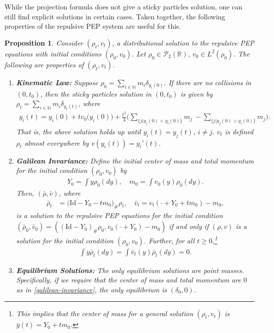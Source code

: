 \documentclass[11pt]{article}
\newtheorem{proposition}[theorem]{Proposition}
\numberwithin{equation}{section}
\begin{document}
        While the projection formula does not give a sticky particles solution, one can still find explicit solutions in certain cases. Taken together, the following properties of the repulsive PEP system are useful for this.
        \begin{proposition}\label{properties}
            Consider $(\rho_t,v_t)$, a distributional solution to the repulsive PEP equations with initial conditions $(\rho_0,v_0)$. Let $\rho_0\in\mathcal{P}_2(\mathbb{R})$, $v_0\in L^2(\rho_0)$. The following are properties of $(\rho_t,v_t)$. 
            \begin{enumerate}
                \item \textbf{Kinematic Law:}\label{particle-kinematics} Suppose $\rho_0=\sum_{i\in\mathbb{N}}m_i\delta_{y_i(0)}$. If there are no collisions in $(0,t_0)$, then the sticky particles solution in $(0,t_0)$ is given by $\rho_t=\sum_{i\in\mathbb{N}}m_i\delta_{y_i(t)}$, where
                \begin{align} \label{kinematics}
                    y_i(t)=y_i(0)+tv_0\big(y_i(0)\big)+\frac{t^2}{4}\Big(\sum_{\{j | y_j(0)<y_i(0)\}}m_j\ -\sum_{\{j | y_j(0)>y_i(0)\}}m_j\Big). 
                \end{align}       
                That is, the above solution holds up until $y_i(t)=y_j(t)$, $i\neq j$. $v_t$ is defined $\rho_t$ almost everywhere by $v(y_i(t))=y_i'(t)$.
                \item \textbf{Galilean Invariance:}\label{galilean-invariance} Define the initial center of mass and total momentum for the initial condition $(\rho_0,v_0)$ by 
                    \begin{align}
                        Y_0=\int y\rho_0(dy), \quad m_0=\int v_0(y)\rho_0(dy).
                    \end{align}
                    Then, $(\bar{\rho},\bar{v})$, where 
                    \begin{align*}
                        \bar{\rho}_t&=\big(\text{Id}-Y_0-tm_0\big)_\#\rho_t, \quad \bar{v}_t=v_t(\cdot+Y_0+tm_0)-m_0,
                    \end{align*}
                    is a solution to the repulsive PEP equations for the initial condition $(\bar{\rho}_0,\bar{v}_0)=((\text{Id}-Y_0)_\#\rho_0,v_0(\cdot+Y_0)-m_0)$ if and only if $(\rho,v)$ is a solution for the initial condition $(\rho_0,v_0)$. Further, for all $t\geq0$,\footnote{This implies that the center of mass for a general solution $(\rho_t,v_t)$ is $\bar{y}(t)=Y_0+tm_0$.}
                    \begin{align*}
                        \int y \bar{\rho}_t(dy)=\int \bar{v}_t(y) \bar{\rho}_t(dy)=0.
                    \end{align*}
                \item \textbf{Equilibrium Solutions:}\label{only-equilibrium} The only equilibrium solutions are point masses. Specifically, if we require that the center of mass and total momentum are $0$ as in \ref{galilean-invariance}, the only equilibrium is $(\delta_0,0)$.
            \end{enumerate}
        \end{proposition}
\end{document}
